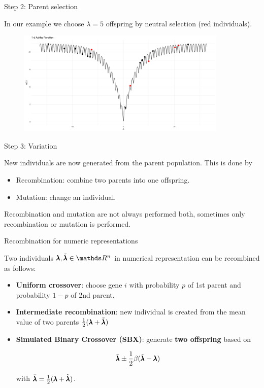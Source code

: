 \begin{frame}{Step 2: Parent selection}
\framebreak

In our example we choose $\lambda = 5$ offspring by neutral selection (red individuals).

\begin{center}
\begin{figure}
\includegraphics[width=\textwidth, height=5cm]{images/ea_ex3.png}
\end{figure}
\end{center}

\end{frame}

\begin{frame}{Step 3: Variation}

New individuals are now generated from the parent population. This is done by

\begin{itemize}
\item Recombination: combine two parents into one offspring.
\item Mutation: change an individual.
\end{itemize}

Recombination and mutation are not always performed both, sometimes only recombination or mutation is performed.

\end{frame}

\begin{frame}{Recombination for numeric representations}

Two individuals $\xx, \tilde\xx \in \R^n$ in numerical representation can be recombined as follows:

\begin{itemize}
\item \textbf{Uniform crossover}: choose gene $i$ with probability $p$ of 1st parent and probability $1-p$ of 2nd parent.
\item \textbf{Intermediate recombination}: new individual is created from the mean value of two parents $\frac{1}{2}(\pmb{\lambda} + \tilde{\pmb{\lambda}})$
\item \textbf{Simulated Binary Crossover (SBX)}: generate \textbf{two offspring} based on

$$
\bar{\pmb{\lambda}} \pm \frac{1}{2} \beta (\tilde{\pmb{\lambda}} - \pmb{\lambda})
$$

with $\bar{\pmb{\lambda}} = \frac{1}{2} (\pmb{\lambda} + \tilde{\pmb{\lambda}})$.
\end{itemize}

\end{frame}

